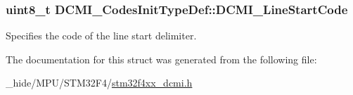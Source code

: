 \subsubsection[{D\+C\+M\+I\+\_\+\+Line\+Start\+Code}]{\setlength{\rightskip}{0pt plus 5cm}uint8\+\_\+t D\+C\+M\+I\+\_\+\+Codes\+Init\+Type\+Def\+::\+D\+C\+M\+I\+\_\+\+Line\+Start\+Code}\label{struct_d_c_m_i___codes_init_type_def_a52df641c10fe4fb79eefa2db68c65f49}
Specifies the code of the line start delimiter. 

The documentation for this struct was generated from the following file\+:\begin{DoxyCompactItemize}
\item 
\+\_\+hide/\+M\+P\+U/\+S\+T\+M32\+F4/\hyperlink{stm32f4xx__dcmi_8h}{stm32f4xx\+\_\+dcmi.\+h}\end{DoxyCompactItemize}

